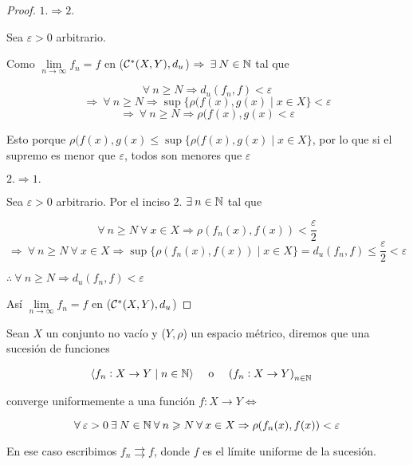 \begin{proof}
    $1. \Rightarrow 2.$

    Sea $\varepsilon > 0$ arbitrario. 

    Como $\lim\limits_{n \to \infty} f_n = f$ en ($ {\mathcal{C}}^{\ast}(X,Y), d_u$) $\Rightarrow \: \exists \: N \in \mathbb{N}$ tal que

    $$\forall \: n \geqslant N \Rightarrow d_u(f_n,f) < \varepsilon $$
    $$\Rightarrow \:  \forall \: n \geqslant N \Rightarrow \sup \{ \rho(f(x),g(x) \mid x \in X \} < \varepsilon$$
    $$\Rightarrow \:  \forall \: n \geqslant N \Rightarrow  \rho(f(x),g(x) < \varepsilon$$

    Esto porque $\rho(f(x),g(x) \leqslant \sup \{ \rho(f(x),g(x) \mid x \in X \}$, por lo que si el supremo es menor que $\varepsilon$, todos son menores que $\varepsilon$

    $2. \Rightarrow 1.$

    Sea $\varepsilon > 0$ arbitrario. Por el inciso 2. $\exists \: n \in \mathbb{N}$ tal que

    $$\forall \: n \geqslant N \: \forall \: x \in X \Rightarrow \rho(f_n(x),f(x)) < \frac{\varepsilon}{2}$$
    $$\Rightarrow \:  \forall \: n \geqslant N \: \forall \: x \in X \Rightarrow \sup \{ \rho(f_n(x),f(x)) \mid x \in X \} = d_u(f_n,f) \leqslant \frac{\varepsilon}{2} < \varepsilon$$

    $\therefore \:  \forall \: n \geqslant N \Rightarrow d_u(f_n,f) < \varepsilon$

    Así $\lim\limits_{n \to \infty} f_n = f$ en ($ {\mathcal{C}}^{\ast}(X,Y), d_u$)
\end{proof}

\begin{definition} \label{defcu}
    Sean $X$ un conjunto no vacío y ($Y,\rho$) un espacio métrico, diremos que una sucesión de funciones

    \begin{align*}
      \langle f_n : X \to Y \mid n \in \mathbb{N} \rangle  && \text{ o } && {\left(f_n : X \to Y \right)}_{n \in \mathbb{N}}&& 
    \end{align*}

    converge uniformemente a una función $f : X \to Y \iff$

    $$\forall \: \varepsilon > 0 \: \exists \: N \in \mathbb{N} \: \forall \: n \geqslant N \: \forall \: x \in X \Rightarrow \rho(f_n(x),f(x)) < \varepsilon$$
\end{definition}

\begin{notation}
    En ese caso escribimos $f_n \rightrightarrows f$, donde $f$ es el límite uniforme de la sucesión.
\end{notation}

